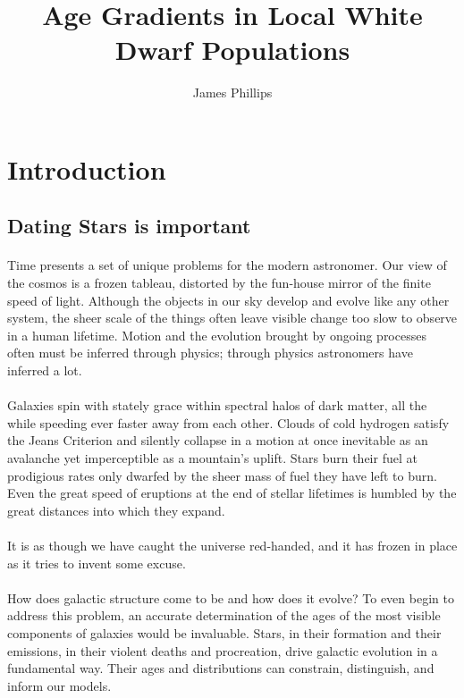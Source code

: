 \documentclass[11pt,letterpaper,draft,titlepage]{article}
\author{James Phillips}
\title{Age Gradients in Local White Dwarf Populations}
\begin{document}
	\pagestyle{empty}

	\tableofcontents
	\newpage
	
	\pagestyle{plain}
	\section{Introduction}
		\subsection{Dating Stars is important}
		\paragraph{}
		Time presents a set of unique problems for the modern astronomer. Our view of the cosmos is a frozen tableau, distorted by the fun-house mirror of the finite speed of light. Although the objects in our sky develop and evolve like any other system, the sheer scale of the things often leave visible change too slow to observe in a human lifetime. Motion and the evolution brought by ongoing processes often must be inferred through physics; through physics astronomers have inferred a lot. 
		\paragraph{}
		Galaxies spin with stately grace within spectral halos of dark matter, all the while speeding ever faster away from each other. Clouds of cold hydrogen satisfy the Jeans Criterion and silently collapse in a motion at once inevitable as an avalanche yet imperceptible as a mountain's uplift. Stars burn their fuel at prodigious rates only dwarfed by the sheer mass of fuel they have left to burn. Even the great speed of eruptions at the end of stellar lifetimes is humbled by the great distances into which they expand.
		\paragraph{}
		It is as though we have caught the universe red-handed, and it has frozen in place as it tries to invent some excuse. 
		\paragraph{}
		How does galactic structure come to be and how does it evolve? To even begin to address this problem, an accurate determination of the ages of the most visible components of galaxies would be invaluable. Stars, in their formation and their emissions, in their violent deaths and procreation, drive galactic evolution in a fundamental way. Their ages and distributions can constrain, distinguish, and inform our models. 
\end{document}
